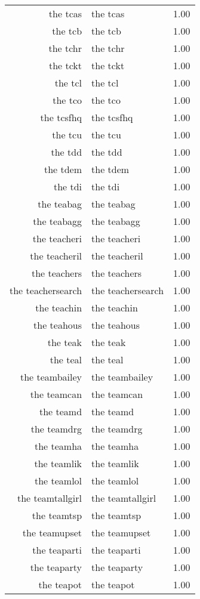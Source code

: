 \begin{table}[ht]
\begin{tabular}{rlr}
  the tcas & the tcas & 1.00 \\ 
  the tcb & the tcb & 1.00 \\ 
  the tchr & the tchr & 1.00 \\ 
  the tckt & the tckt & 1.00 \\ 
  the tcl & the tcl & 1.00 \\ 
  the tco & the tco & 1.00 \\ 
  the tcsfhq & the tcsfhq & 1.00 \\ 
  the tcu & the tcu & 1.00 \\ 
  the tdd & the tdd & 1.00 \\ 
  the tdem & the tdem & 1.00 \\ 
  the tdi & the tdi & 1.00 \\ 
  the teabag & the teabag & 1.00 \\ 
  the teabagg & the teabagg & 1.00 \\ 
  the teacheri & the teacheri & 1.00 \\ 
  the teacheril & the teacheril & 1.00 \\ 
  the teachers & the teachers & 1.00 \\ 
  the teachersearch & the teachersearch & 1.00 \\ 
  the teachin & the teachin & 1.00 \\ 
  the teahous & the teahous & 1.00 \\ 
  the teak & the teak & 1.00 \\ 
  the teal & the teal & 1.00 \\ 
  the teambailey & the teambailey & 1.00 \\ 
  the teamcan & the teamcan & 1.00 \\ 
  the teamd & the teamd & 1.00 \\ 
  the teamdrg & the teamdrg & 1.00 \\ 
  the teamha & the teamha & 1.00 \\ 
  the teamlik & the teamlik & 1.00 \\ 
  the teamlol & the teamlol & 1.00 \\ 
  the teamtallgirl & the teamtallgirl & 1.00 \\ 
  the teamtsp & the teamtsp & 1.00 \\ 
  the teamupset & the teamupset & 1.00 \\ 
  the teaparti & the teaparti & 1.00 \\ 
  the teaparty & the teaparty & 1.00 \\ 
  the teapot & the teapot & 1.00 \\ 

\end{tabular}
\end{table}
